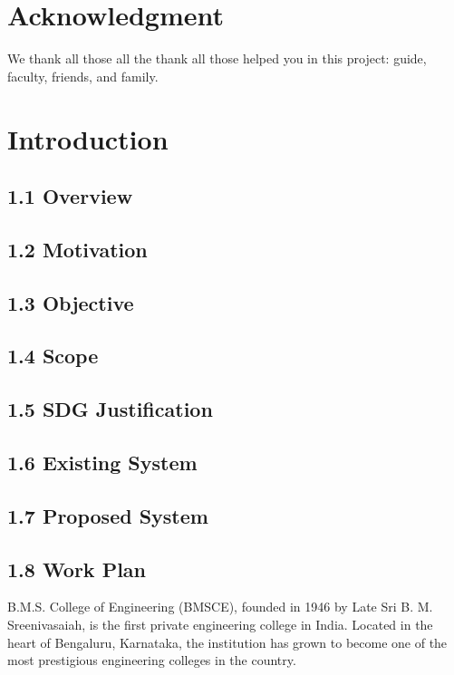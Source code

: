 \documentclass[12pt,a4paper]{report}
\begin{document}
\chapter*{Acknowledgment}
\thispagestyle{empty}
We thank all those all the thank all those helped you in this project: guide, faculty, friends, and family.
\newpage
\tableofcontents
\thispagestyle{empty}
\newpage
\listoffigures
\thispagestyle{empty}
\newpage
\listoftables
\thispagestyle{empty}

\clearpage
{}
\setcounter{page}{1}

\chapter{Introduction}
\section{1.1 Overview}
\section{1.2 Motivation}
\section{1.3 Objective}
\section{1.4 Scope}
\section{1.5 SDG Justification}
\section{1.6 Existing System}
\section{1.7 Proposed System}
\section{1.8 Work Plan}

B.M.S. College of Engineering (BMSCE), founded in 1946 by Late Sri B. M. Sreenivasaiah, 
is the first private engineering college in India. Located in the heart of Bengaluru, 
Karnataka, the institution has grown to become one of the most prestigious engineering 
colleges in the country. 
\end{document}
